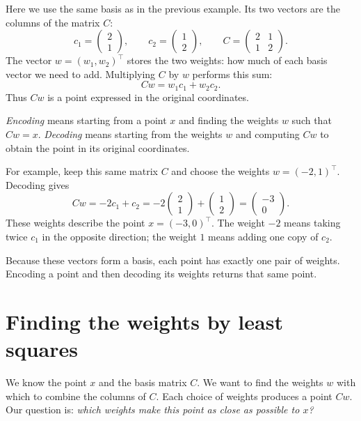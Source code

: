 \documentclass[a4paper,12pt,oneside]{report}
\begin{document}
Here we use the same basis as in the previous example. Its two vectors
are the columns of the matrix $C$:
\[
  c_1=\begin{pmatrix}2\\1\end{pmatrix},\qquad
  c_2=\begin{pmatrix}1\\2\end{pmatrix},\qquad
  C=\begin{pmatrix}2&1\\1&2\end{pmatrix}.
\]
The vector $w=(w_1,w_2)^\top$ stores the two weights: how much of each
basis vector we need to add. Multiplying $C$ by $w$ performs this sum:
\[
  Cw=w_1c_1+w_2c_2.
\]
Thus $Cw$ is a point expressed in the original coordinates.

\emph{Encoding} means starting from a point $x$ and finding the weights
$w$ such that $Cw=x$. \emph{Decoding} means starting from the weights
$w$ and computing $Cw$ to obtain the point in its original coordinates.

For example, keep this same matrix $C$ and choose the weights
$w=(-2,1)^\top$. Decoding gives
\[
  Cw=-2c_1+c_2
  =-2\begin{pmatrix}2\\1\end{pmatrix}
   +\begin{pmatrix}1\\2\end{pmatrix}
  =\begin{pmatrix}-3\\0\end{pmatrix}.
\]
These weights describe the point $x=(-3,0)^\top$. The weight $-2$ means
taking twice $c_1$ in the opposite direction; the weight $1$ means adding
one copy of $c_2$.

Because these vectors form a basis, each point has exactly one pair of
weights. Encoding a point and then decoding its weights returns that
same point.

\section{Finding the weights by least squares}

We know the point $x$ and the basis matrix $C$. We want to find the
weights $w$ with which to combine the columns of $C$. Each choice of
weights produces a point $Cw$. Our question is:
\emph{which weights make this point as close as possible to $x$?}
\end{document}
